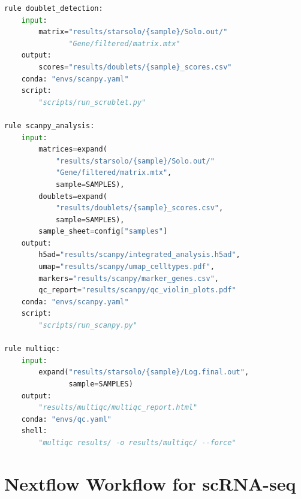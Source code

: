 \begin{lstlisting}[language=Python, caption={Snakemake workflow for 10x
Chromium scRNA-seq analysis using STARsolo and Scanpy.},
label={lst:scrnaseq:snakemake}]
rule doublet_detection:
    input:
        matrix="results/starsolo/{sample}/Solo.out/"
               "Gene/filtered/matrix.mtx"
    output:
        scores="results/doublets/{sample}_scores.csv"
    conda: "envs/scanpy.yaml"
    script:
        "scripts/run_scrublet.py"

rule scanpy_analysis:
    input:
        matrices=expand(
            "results/starsolo/{sample}/Solo.out/"
            "Gene/filtered/matrix.mtx",
            sample=SAMPLES),
        doublets=expand(
            "results/doublets/{sample}_scores.csv",
            sample=SAMPLES),
        sample_sheet=config["samples"]
    output:
        h5ad="results/scanpy/integrated_analysis.h5ad",
        umap="results/scanpy/umap_celltypes.pdf",
        markers="results/scanpy/marker_genes.csv",
        qc_report="results/scanpy/qc_violin_plots.pdf"
    conda: "envs/scanpy.yaml"
    script:
        "scripts/run_scanpy.py"

rule multiqc:
    input:
        expand("results/starsolo/{sample}/Log.final.out",
               sample=SAMPLES)
    output:
        "results/multiqc/multiqc_report.html"
    conda: "envs/qc.yaml"
    shell:
        "multiqc results/ -o results/multiqc/ --force"
\end{lstlisting}


\section{Nextflow Workflow for scRNA-seq}
\label{sec:scrnaseq:nextflow}

